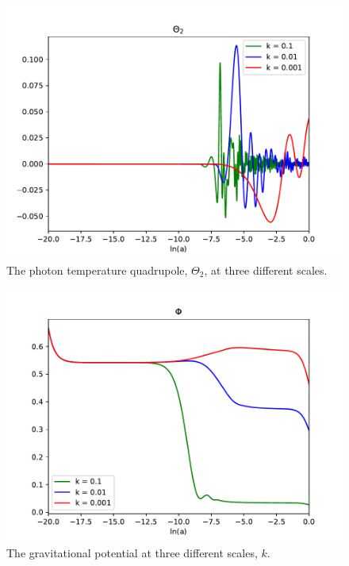 \documentclass{aa}
\begin{document}
\begin{figure}[h!]
   \includegraphics[scale=0.5]{Figures/milestone_3/theta_2.pdf}
   \caption{The photon temperature quadrupole, $\Theta_2$, at three different scales.}
   \label{fig:M3_theta2}
\end{figure}

\begin{figure}[h!]
   \includegraphics[scale=0.5]{Figures/milestone_3/phi.pdf}
   \caption{The gravitational potential at three different scales, $k$.}\label{fig:M3_phi}
\end{figure}
\end{document}
